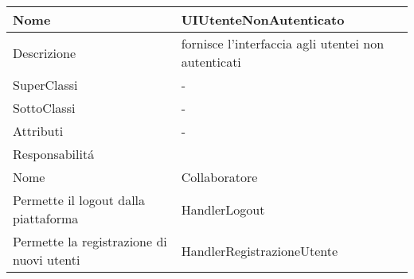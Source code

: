 \begin{center} %
    \begin{longtable}{ |p{3cm}|p{3cm}|p{3cm}|p{3cm}| }
        \hline
        Nome & \multicolumn{3}{|p{9cm}|}{UIUtenteNonAutenticato} \\\hline
        Descrizione & \multicolumn{3}{|p{9cm}|}{fornisce l'interfaccia agli utentei non autenticati} \\\hline
        SuperClassi & \multicolumn{3}{|p{9cm}|}{-} \\\hline
        SottoClassi & \multicolumn{3}{|p{9cm}|}{-} \\\hline
        Attributi & \multicolumn{3}{|p{9cm}|}{-} \\\hline
        \multicolumn{4}{|p{12cm}|}{Responsabilit\'a} \\\hline %
        \multicolumn{2}{|p{6cm}|}{Nome} & \multicolumn{2}{|p{6cm}|}{Collaboratore} \\\hline %
        \multicolumn{2}{|p{6cm}|}{Permette il logout dalla piattaforma} & \multicolumn{2}{|p{6cm}|}{HandlerLogout} \\\hline
        \multicolumn{2}{|p{6cm}|}{Permette la registrazione di nuovi utenti} & \multicolumn{2}{|p{6cm}|}{HandlerRegistrazioneUtente} \\\hline
        
    \end{longtable}
\end{center}

        
